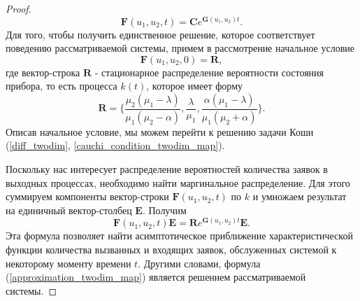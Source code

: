 \begin{proof}
	\begin{equation} \label{diff_twodim_map}
		\boldsymbol{F}(u_{1},u_{2},t)=\boldsymbol{C}e^{\boldsymbol{G}(u_{1},u_{2})t}.
	\end{equation}
	Для того, чтобы получить единственное решение, которое соответствует поведению рассматриваемой системы, примем в рассмотрение начальное условие
	\begin{equation} \label{cauchi_condition_twodim_map}
		\boldsymbol{F}(u_{1},u_{2},0)=\boldsymbol{R},
	\end{equation}
	где вектор-строка $\boldsymbol{R}$ - стационарное распределение вероятности состояния прибора, то есть процесса $k(t)$, которое имеет форму \cite{nazarov2017asymptotic}
	\begin{equation*}
		\boldsymbol{R}=\{\frac{\mu_{2}(\mu_{1} - \lambda)}{\mu_{1}(\mu_{2} - \alpha)},\frac{\lambda}{\mu_{1}},\frac{\alpha(\mu_{1} - \lambda)}{\mu_{1}(\mu_{2} + \alpha)}\}.
	\end{equation*}
	Описав начальное условие, мы можем перейти к решению задачи Коши (\ref{diff_twodim}, \ref{cauchi_condition_twodim_map}).
	
	Поскольку нас интересует распределение вероятностей количества заявок в выходных процессах, необходимо найти маргинальное распределение. Для этого суммируем компоненты вектор-строки $\boldsymbol{F}(u_{1},u_{2},t)$ по $k$ и умножаем результат на единичный вектор-столбец $\boldsymbol{E}$. Получим
	\begin{equation}\label{approximation_twodim_map}
		\boldsymbol{F}(u_{1},u_{2},t)\boldsymbol{E}=\boldsymbol{R}e^{\boldsymbol{G}(u_{1},u_{2})t}\boldsymbol{E}.
	\end{equation}
	Эта формула позволяет найти асимптотическое приближение характеристической функции количества вызванных и входящих заявок, обслуженных системой к некоторому моменту времени $t$. Другими словами, формула (\ref{approximation_twodim_map}) является решением рассматриваемой системы. 
\end{proof}
\clearpage